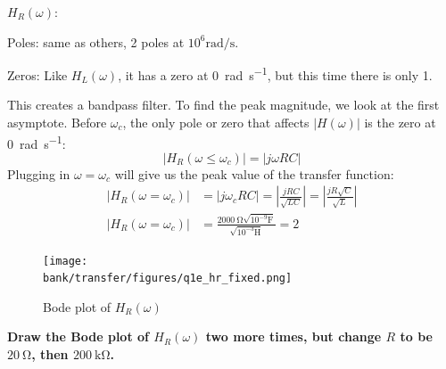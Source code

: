 \begin{enumerate}
{$H_R(\omega)$:

Poles: same as others, 2 poles at $10^6 \si{\radian\per\second}$.

Zeros: Like $H_L(\omega)$, it has a zero at \SI{0}{\radian\per\second}, but this time there is only 1.

This creates a bandpass filter. To find the peak magnitude, we look at the first asymptote. Before $\omega_c$, the only pole or zero that affects $|H(\omega)|$ is the zero at \SI{0}{\radian\per\second}:
\[|H_{R}(\omega \leq \omega_c)|= |j\omega RC|\]
Plugging in $\omega=\omega_c$ will give us the peak value of the transfer function:
\begin{align*}
|H_{R}(\omega = \omega_c)|&= |j\omega_c RC|=\left|\frac{jRC}{\sqrt{LC}}\right| = \left|\frac{jR\sqrt{C}}{\sqrt{L}}\right| \\
 |H_{R}(\omega = \omega_c)|&= \frac{\SI{2000}{\ohm}\sqrt{10^{-9}\si{\farad}}}{\sqrt{10^{-3}\si{\henry}}} = 2
\end{align*}

  \begin{figure}[H]\centering
  \texttt{[image: \\bank/transfer/figures/q1e\_hr\_fixed.png]}
  \caption{Bode plot of $H_R(\omega)$}
  \end{figure}
  
}

\qitem \textbf{Draw the Bode plot of $H_R(\omega)$ two more times, but change $R$ to be $\SI{20}{\ohm}$, then $\SI{200}{\kilo\ohm}$.}

\end{enumerate}

